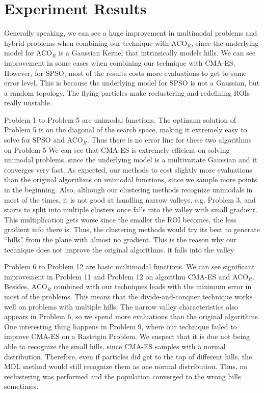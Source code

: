 
\section{Experiment Results}

Generally speaking, we can see a huge improvement in multimodal problems and hybrid problems
when combining our technique with ACO$_R$,
since the underlying model for ACO$_R$ is a Gaussian Kernel that intrinsically models hills.
We can see improvement in some cases when combining our technique with CMA-ES.
However, for SPSO, most of the results costs more evaluations to get to same error level.
This is because the underlying model for SPSO is not a Gaussian, but a random topology.
The flying particles make reclustering and redefining ROIs really unstable.


Problem 1 to Problem 5 are unimodal functions.
The optimum solution of Problem 5 is on the diagonal of the search space, 
making it extremely easy to solve for SPSO and ACO$_R$.
Thus there is no error line for these two algorithms on Problem 5
We can see that CMA-ES is extremely efficient on solving unimodal problems, 
since the underlying model is a multivariate Gaussian and it converges very fast.
As expected, our methods to cost slightly more evaluations than the original algorithms on unimodal functions,
since we sample more points in the beginning. 
Also, although our clustering methods recognize unimodals in most of the times,
it is not good at handling narrow valleys, e.g. Problem 3, 
and starts to split into multiple clusters once falls into the valley with small gradient.
This multiplication gets worse since the smaller the ROI becomes, the less gradient info there is.
Thus, the clustering methods would try its best to generate ``hills'' from the plane with almost no gradient.
This is the reason why our technique does not improve the original algorithms.
it falls into the valley


Problem 6 to Problem 12 are basic multimodal functions.
We can see significant improvement in Problem 11 and Problem 12 on algorithm CMA-ES and ACO$_R$.
Besides, ACO$_R$ combined with our techniques leads with the minimum error in most of the problems.
This means that the divide-and-conquer technique works well on problems with multiple hills.
The narrow valley characteristics also appears in Problem 6, so we spend more evaluations than the original algorithms.
One interesting thing happens in Problem 9, where our technique failed to improve CMA-ES on a Rastrigin Problem.
We suspect that it is due not being able to recognize the small hills, since CMA-ES samples with a normal distribution.
Therefore, even if particles did get to the top of different hills, the MDL method would still recognize them as one normal distribution.
Thus, no reclustering was performed and the population converged to the wrong hills sometimes.

